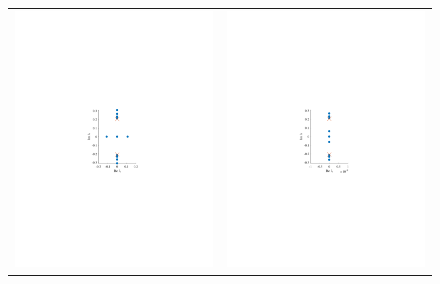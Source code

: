 \documentclass[review,onefignum,onetabnum]{siamart171218}
\begin{document}
\begin{figure}[ht]
\centering
\begin{tabular}{cc}
\includegraphics{spec12_double1}&
\includegraphics{spec12_double2}

\end{tabular}
\end{figure}
\end{document}
